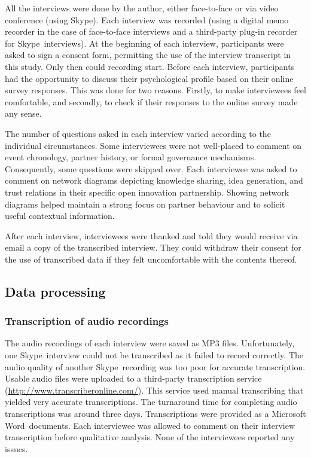 All the interviews were done by the author, either face-to-face or via video conference (using Skype\texttrademark). Each interview was recorded (using a digital memo recorder in the case of face-to-face interviews and a third-party plug-in recorder for Skype\texttrademark\ interviews). At the beginning of each interview, participants were asked to sign a consent form, permitting the use of the interview transcript in this study. Only then could recording start. Before each interview, participants had the opportunity to discuss their psychological profile based on their online survey responses. This was done for two reasons. Firstly, to make interviewees feel comfortable, and secondly, to check if their responses to the online survey made any sense. \medskip

The number of questions asked in each interview varied according to the individual circumstances. Some interviewees were not well-placed to comment on event chronology, partner history, or formal governance mechanisms. Consequently, some questions were skipped over. Each interviewee was asked to comment on network diagrams depicting knowledge sharing, idea generation, and trust relations in their specific open innovation partnership. Showing network diagrams helped maintain a strong focus on partner behaviour and to solicit useful contextual information. \medskip

After each interview, interviewees were thanked and told they would receive via email a copy of the transcribed interview. They could withdraw their consent for the use of transcribed data if they felt uncomfortable with the contents thereof. 

\subsection{Data processing}

\subsubsection{Transcription of audio recordings}

The audio recordings of each interview were saved as MP3 files. Unfortunately, one Skype\texttrademark\ interview could not be transcribed as it failed to record correctly. The audio quality of another Skype\texttrademark\ recording was too poor for accurate transcription. Usable audio files were uploaded to a third-party transcription service (\url{http://www.transcriberonline.com/}). This service used manual transcribing that yielded very accurate transcriptions. The turnaround time for completing audio transcriptions was around three days. Transcriptions were provided as a Microsoft Word\texttrademark\ documents. Each interviewee was allowed to comment on their interview transcription before qualitative analysis. None of the interviewees reported any issues. 

